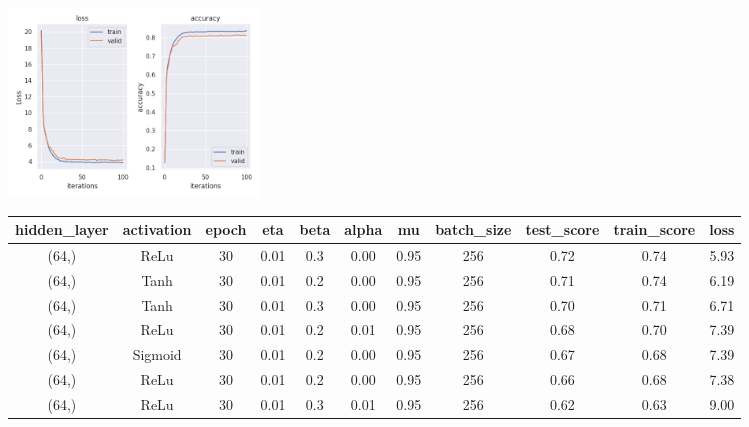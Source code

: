 \documentclass[10pt]{SelfArx} %
\begin{document}
\begin{center}\centering
	\includegraphics[width=\linewidth,height=5cm]{img/satlog-plots2}
\end{center}

\begin{table}[hbt]\centering
  \begin{tabular*}{1\textwidth}{@{\extracolsep{\fill} }ccccccccccc@{}}
		\toprule
		hidden\_layer & activation & epoch & eta & beta & alpha & mu & batch\_size & test\_score & train\_score & loss \\ \midrule
		(64,) & ReLu & 30 & 0.01 & 0.3 & 0.00 & 0.95 & 256 & 0.72 & 0.74 & 5.93 \\
		(64,) & Tanh & 30 & 0.01 & 0.2 & 0.00 & 0.95 & 256 & 0.71 & 0.74 & 6.19 \\
		(64,) & Tanh & 30 & 0.01 & 0.3 & 0.00 & 0.95 & 256 & 0.70 & 0.71 & 6.71 \\
		(64,) & ReLu & 30 & 0.01 & 0.2 & 0.01 & 0.95 & 256 & 0.68 & 0.70 & 7.39 \\
		(64,) & Sigmoid & 30 & 0.01 & 0.2 & 0.00 & 0.95 & 256 & 0.67 & 0.68 & 7.39 \\
		(64,) & ReLu & 30 & 0.01 & 0.2 & 0.00 & 0.95 & 256 & 0.66 & 0.68 & 7.38 \\
		(64,) & ReLu & 30 & 0.01 & 0.3 & 0.01 & 0.95 & 256 & 0.62 & 0.63 & 9.00 \\ \bottomrule
	\end{tabular*}
    \label{tsatlog}
\end{table}
\end{document}
